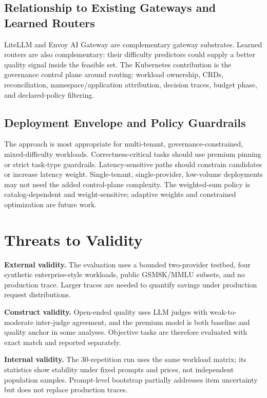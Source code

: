 \documentclass[10pt,journal,compsoc]{IEEEtran}
\begin{document}
\subsection{Relationship to Existing Gateways and Learned Routers}
LiteLLM and Envoy AI Gateway are complementary gateway substrates. Learned
routers are also complementary: their difficulty predictors could supply a
better quality signal inside the feasible set. The Kubernetes contribution is
the governance control plane around routing: workload ownership, CRDs,
reconciliation, namespace/application attribution, decision traces, budget
phase, and declared-policy filtering.

\subsection{Deployment Envelope and Policy Guardrails}
The approach is most appropriate for multi-tenant, governance-constrained,
mixed-difficulty workloads. Correctness-critical tasks should use premium
pinning or strict task-type guardrails. Latency-sensitive paths should constrain
candidates or increase latency weight. Single-tenant, single-provider,
low-volume deployments may not need the added control-plane complexity. The
weighted-sum policy is catalog-dependent and weight-sensitive; adaptive weights
and constrained optimization are future work.

\section{Threats to Validity}

\textbf{External validity.} The evaluation uses a bounded two-provider testbed,
four synthetic enterprise-style workloads, public GSM8K/MMLU subsets, and no
production trace. Larger traces are needed to quantify savings under production
request distributions.

\textbf{Construct validity.} Open-ended quality uses LLM judges with
weak-to-moderate inter-judge agreement, and the premium model is both baseline
and quality anchor in some analyses. Objective tasks are therefore evaluated
with exact match and reported separately.

\textbf{Internal validity.} The 30-repetition run uses the same workload matrix;
its statistics show stability under fixed prompts and prices, not independent
population samples. Prompt-level bootstrap partially addresses item uncertainty
but does not replace production traces.
\end{document}
